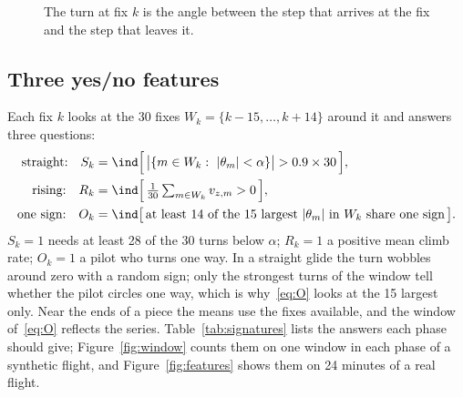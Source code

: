 \begin{figure}
\centering
{}
\caption{The turn at fix $k$ is the angle between the step that arrives at the fix and the step that
leaves it.}
\label{fig:turn}
\end{figure}

\subsection{Three yes/no features}\label{sec:features}

Each fix $k$ looks at the 30 fixes $W_k=\{k-15,\dots,k+14\}$ around it and answers three
questions:
\begin{align}
  \text{straight:}\quad S_k &= \ind\Bigl[\,\bigl|\{m\in W_k:\ |\theta_m|<\alpha\}\bigr| > 0.9\times30\,\Bigr], \label{eq:S}\\
  \text{rising:}\quad R_k &= \ind\Bigl[\,\tfrac{1}{30}\textstyle\sum_{m\in W_k} v_{z,m} > 0\,\Bigr], \label{eq:R}\\
  \text{one sign:}\quad O_k &= \ind\bigl[\,\text{at least 14 of the 15 largest $|\theta_m|$ in $W_k$ share one sign}\,\bigr]. \label{eq:O}
\end{align}
$S_k=1$ needs at least 28 of the 30 turns below $\alpha$; $R_k=1$ a positive mean climb rate;
$O_k=1$ a pilot who turns one way.
In a straight glide the turn wobbles around zero with a random sign; only the strongest turns of
the window tell whether the pilot circles one way, which is why~\eqref{eq:O} looks at the 15 largest
only. Near the ends of a piece the means use the fixes available, and the window of~\eqref{eq:O}
reflects the series. Table~\ref{tab:signatures} lists the answers each phase should give;
Figure~\ref{fig:window} counts them on one window in each phase of a synthetic flight, and
Figure~\ref{fig:features} shows them on 24 minutes of a real flight.

